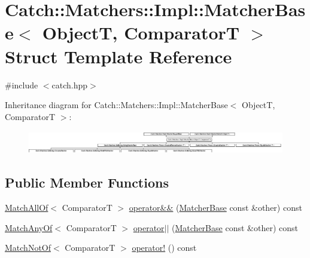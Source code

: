 \hypertarget{struct_catch_1_1_matchers_1_1_impl_1_1_matcher_base}{}\section{Catch\+:\+:Matchers\+:\+:Impl\+:\+:Matcher\+Base$<$ ObjectT, ComparatorT $>$ Struct Template Reference}
\label{struct_catch_1_1_matchers_1_1_impl_1_1_matcher_base}


{\ttfamily \#include $<$catch.\+hpp$>$}

Inheritance diagram for Catch\+:\+:Matchers\+:\+:Impl\+:\+:Matcher\+Base$<$ ObjectT, ComparatorT $>$\+:\begin{figure}[H]
\begin{center}
\leavevmode
\includegraphics[height=1.006289cm]{struct_catch_1_1_matchers_1_1_impl_1_1_matcher_base}
\end{center}
\end{figure}
\subsection*{Public Member Functions}
\begin{DoxyCompactItemize}
\item 
\mbox{\hyperlink{struct_catch_1_1_matchers_1_1_impl_1_1_match_all_of}{Match\+All\+Of}}$<$ ComparatorT $>$ \mbox{\hyperlink{struct_catch_1_1_matchers_1_1_impl_1_1_matcher_base_a3deede6b29d20c15cb5efc79df40a520}{operator\&\&}} (\mbox{\hyperlink{struct_catch_1_1_matchers_1_1_impl_1_1_matcher_base}{Matcher\+Base}} const \&other) const
\item 
\mbox{\hyperlink{struct_catch_1_1_matchers_1_1_impl_1_1_match_any_of}{Match\+Any\+Of}}$<$ ComparatorT $>$ \mbox{\hyperlink{struct_catch_1_1_matchers_1_1_impl_1_1_matcher_base_ae0345ee76d109ac6d0241be261450ebc}{operator$\vert$$\vert$}} (\mbox{\hyperlink{struct_catch_1_1_matchers_1_1_impl_1_1_matcher_base}{Matcher\+Base}} const \&other) const
\item 
\mbox{\hyperlink{struct_catch_1_1_matchers_1_1_impl_1_1_match_not_of}{Match\+Not\+Of}}$<$ ComparatorT $>$ \mbox{\hyperlink{struct_catch_1_1_matchers_1_1_impl_1_1_matcher_base_a85174b5b27113f7bdc47c140c1c72602}{operator!}} () const
\end{DoxyCompactItemize}

